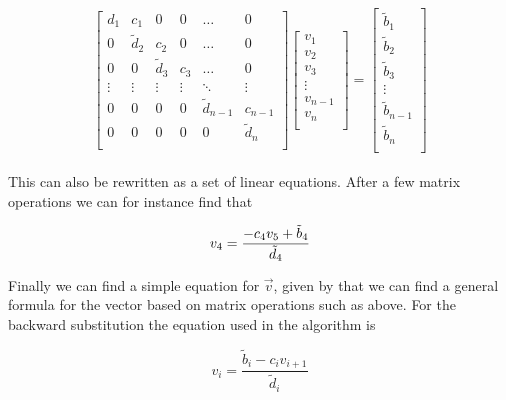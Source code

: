 \documentclass{article}
\begin{document}
    \begin{equation*} \label{eq:fullmatrixeqbackward}
      \begin{bmatrix}
        d_1 & c_1 & 0 & 0 & \dots & 0 \\
        0 & \tilde{d}_2 & c_2 & 0 & \dots & 0 \\
        0 & 0 & \tilde{d}_3 & c_3 & \dots & 0 \\
        \vdots & \vdots & \vdots & \vdots & \ddots & \vdots \\
        0 & 0 & 0 & 0 & \tilde{d}_{n-1} & c_{n-1} \\
        0 & 0 & 0 & 0 & 0 & \tilde{d}_n \\
      \end{bmatrix}
      \begin{bmatrix}
        v_1 \\
        v_2 \\
        v_3 \\
        \vdots \\
        v_{n-1} \\
        v_n \\
      \end{bmatrix}
      =
      \begin{bmatrix}
        \tilde{b}_1 \\
        \tilde{b}_2 \\
        \tilde{b}_3 \\
        \vdots \\
        \tilde{b}_{n-1} \\
        \tilde{b}_n \\
      \end{bmatrix}
    \end{equation*} \\

    This can also be rewritten as a set of linear equations. After a few matrix operations we can for instance find that

    \begin{equation*}
      v_4 = \frac{- c_4 v_5 + \tilde{b}_4}{\tilde{d}_4} \\
    \end{equation*}

    Finally we can find a simple equation for $\vec{v}$, given by that we can find a general formula for the vector based on matrix operations such as above. For the backward substitution the equation used in the algorithm is

    \begin{equation}
      v_i = \frac{\tilde{b}_i - c_i v_{i+1}}{\tilde{d}_i} \label{eq:solutionv}
    \end{equation}
\end{document}
